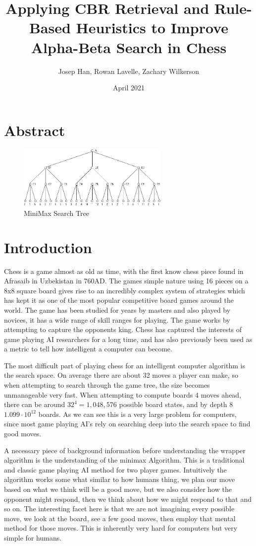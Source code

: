 \documentclass[letterpaper]{article}
\title{Applying CBR Retrieval and Rule-Based Heuristics to Improve Alpha-Beta Search in Chess}
\author{Josep Han, Rowan Lavelle, Zachary Wilkerson}
\date{April 2021}
\begin{document}
\maketitle
\section{Abstract}
\begin{figure}
    \centering
    \includegraphics[width=0.65\textwidth]{minimax.jpg}
    \caption{MiniMax Search Tree}
    \label{fig:my_label}
\end{figure}

\section{Introduction}
Chess is a game almost as old as time, with the first know chess piece found in Afrasaib in Uzbekistan in 760AD. The games simple nature using 16 pieces on a 8x8 square board gives rise to an incredibly complex system of strategies which has kept it as one of the most popular competitive board games around the world. The game has been studied for years by masters and also played by novices, it has a wide range of skill ranges for playing. The game works by attempting to capture the opponents king. Chess has captured the interests of game playing AI researchers for a long time, and has also previously been used as a metric to tell how intelligent a computer can become.

The most difficult part of playing chess for an intelligent computer algorithm is the search space. On average there are about 32 moves a player can make, so when attempting to search through the game tree, the size becomes unmanageable very fast. When attempting to compute boards 4 moves ahead, there can be around $32^4=1,048,576$ possible board states, and by depth 8 $1.099 \cdot 10^12$ boards. As we can see this is a very large problem for computers, since most game playing AI's rely on searching deep into the search space to find good moves.

A necessary piece of background information before understanding the wrapper algorithm is the understanding of the minimax Algorithm. This is a traditional and classic game playing AI method for two player games. Intuitively the algorithm works some what similar to how humans thing, we plan our move based on what we think will be a good move, but we also consider how the opponent might respond, then we think about how we might respond to that and so on. The interesting facet here is that we are not imagining every possible move, we look at the board, see a few good moves, then employ that mental method for those moves. This is inherently very hard for computers but very simple for humans.
\end{document}
